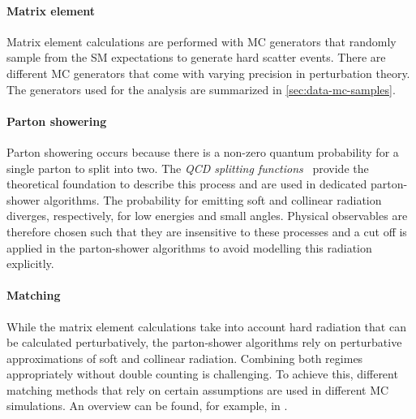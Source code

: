 \paragraph{Matrix element}
Matrix element calculations are performed with MC generators that randomly sample from the SM expectations to generate hard scatter events. 
There are different MC generators that come with varying precision in perturbation theory. The generators used for the \HWW analysis are summarized in \cref{sec:data-mc-samples}.

\paragraph{Parton showering}
Parton showering occurs because there is a non-zero quantum probability for a single parton to split into two. 
The \emph{QCD splitting functions}~\cite{Altarelli:1977zs} provide the theoretical foundation to describe this process and are used in dedicated parton-shower algorithms.
The probability for emitting soft and collinear radiation diverges, respectively, for low energies and small angles. 
Physical observables are therefore chosen such that they are insensitive to these processes and a cut off is applied in the parton-shower algorithms to avoid modelling this radiation explicitly.

\paragraph{Matching} 
While the matrix element calculations take into account hard radiation that can be calculated perturbatively, the parton-shower algorithms rely on perturbative approximations of soft and collinear radiation. 
Combining both regimes appropriately without double counting is challenging.
To achieve this, different matching methods that rely on certain assumptions are used in different MC simulations. An overview can be found, for example, in .

